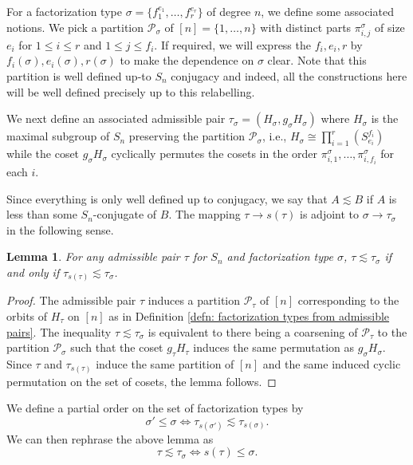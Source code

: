 \documentclass[10pt]{article}
\theoremstyle{plain}
\newtheorem{lemma}[theorem]{Lemma}
\theoremstyle{definition}
\numberwithin{equation}{section}
\begin{document}
For a factorization type $\sigma = \{f_1^{e_1},\dots,f_r^{e_r}\}$ of degree $n$, we define some associated notions. We pick a partition $\mathcal P_\sigma$ of $[n] = \{1,\dots,n\}$ with distinct parts $\pi^{\sigma}_{i,j}$ of size $e_i$ for $1\leq i\leq r$ and $1 \leq j \leq f_i$. If required, we will express the $f_i,e_i,r$ by $f_i(\sigma),e_i(\sigma),r(\sigma)$ to make the dependence on $\sigma$ clear. Note that this partition is well defined up-to $S_n$ conjugacy and indeed, all the constructions here will be well defined precisely up to this relabelling.

We next define an associated admissible pair $\tau_\sigma = (H_\sigma,g_\sigma H_\sigma)$ where $H_\sigma$ is the maximal subgroup of $S_n$ preserving the partition $\mathcal P_\sigma$, i.e., $H_\sigma \cong \prod_{i=1}^r(S_{e_i}^{f_i})$ while the coset $g_\sigma H_\sigma$ cyclically permutes the cosets in the order $\pi^\sigma_{i,1},\dots,\pi^{\sigma}_{i,f_i}$ for each $i$.

Since everything is only well defined up to conjugacy, we say that $A \lesssim B$ if $A$ is less than some $S_n$-conjugate of $B$. The mapping $\tau \to s(\tau)$ is adjoint to $\sigma \to \tau_\sigma$ in the following sense. 

\begin{lemma}\label{lemma: adjointness between pairs and types}
For any admissible pair $\tau$ for $S_n$ and factorization type $\sigma$, $\tau \lesssim \tau_\sigma$ if and only if $\tau_{s(\tau)} \lesssim \tau_{\sigma}$.
\end{lemma}
\begin{proof}
The admissible pair $\tau$ induces a partition $\mathcal P_\tau$ of $[n]$ corresponding to the orbits of $H_\tau$ on $[n]$ as in Definition \ref{defn: factorization types from admissible pairs}. The inequality $\tau \lesssim \tau_\sigma$ is equivalent to there being a coarsening of $\mathcal P_\tau$ to the partition $\mathcal P_\sigma$ such that the coset $g_\tau H_\tau$ induces the same permutation as $g_\sigma H_\sigma$. Since $\tau$ and $\tau_{s(\tau)}$ induce the same partition of $[n]$ and the same induced cyclic permutation on the set of cosets, the lemma follows. 
\end{proof}

We define a partial order on the set of factorization types by 
\[\sigma' \leq \sigma \iff \tau_{s(\sigma')} \lesssim \tau_{s(\sigma)}.\]
We can then rephrase the above lemma as
\[\tau \lesssim \tau_\sigma \iff s(\tau) \leq \sigma.\]
\end{document}
